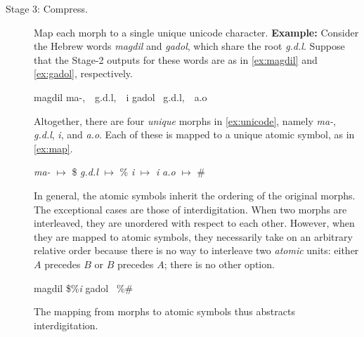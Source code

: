 \begin{description}
\item[Stage 3: Compress.] Map each morph to a single unique unicode character.
\textbf{Example:} Consider the 
Hebrew words \textit{magdil} and \textit{gadol}, which share the root \textit{g.d.l}. 
Suppose that the Stage-2 outputs for these words are as in \eqref{ex:magdil} and \eqref{ex:gadol}, respectively. 
\begin{exe}  \ex \label{ex:unicode} \begin{xlist}
	\ex magdil \quad ma-, \,\, g.d.l, \,\, i 
	\label{ex:magdil}
	\ex gadol \, \quad  g.d.l, \,\, a.o
	\label{ex:gadol}
	\end{xlist}
\end{exe}
Altogether, there are four \emph{unique} morphs in \eqref{ex:unicode}, namely \textit{ma-}, \textit{g.d.l}, 
\textit{i}, and \textit{a.o}.
Each of these is mapped to a unique atomic symbol, as in \eqref{ex:map}.
\begin{exe}
	\ex  \textit{ma-} $\mapsto$ \$ \quad \textit{g.d.l} $\mapsto$ \% \quad
\textit{i} $\mapsto$ \textit{i} \quad \textit{a.o} $\mapsto$ \#
\label{ex:map}
\end{exe}
In general, the atomic symbols inherit the ordering of the original morphs. 
The exceptional cases are those of interdigitation. When two morphs are interleaved, 
they are unordered with respect to each other.
However, when they are mapped to atomic symbols, they necessarily 
take on an arbitrary relative order because there is no way to interleave two 
\emph{atomic} units: either $A$ precedes $B$ or $B$ precedes $A$; 
there is no other option.
\begin{exe}  
	\ex \label{ex:reassembled} \begin{xlist}
	\ex magdil \quad \$\%\textit{i}
	\label{ex:re-magdil}
	\ex gadol \, \quad \%\#
	\label{ex:re-gadol}
	\end{xlist}
\end{exe}
The mapping from morphs to atomic symbols thus abstracts interdigitation.  


\end{description}
